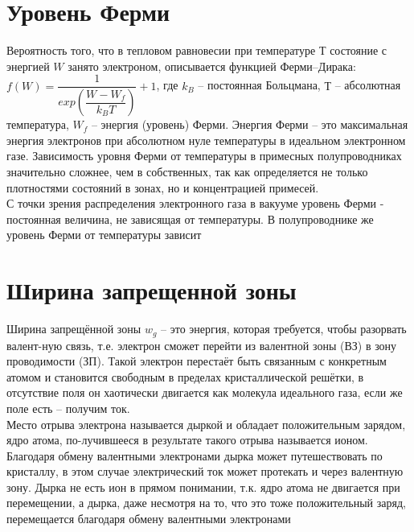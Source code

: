 \begin{multicols*}{2}
		\section{Уровень Ферми}
		Вероятность того, что в тепловом равновесии при температуре $Т$ состояние с энергией $W$ занято электроном, описывается функцией Ферми–Дирака: \\
		$f(W) = \dfrac{1}{exp(\dfrac{W-W_f}{k_BT})}+1$, где $k_B$ – постоянная Больцмана, $Т$ – абсолютная температура, $W_f$ – энергия (уровень) Ферми. Энергия Ферми – это максимальная энергия электронов при абсолютном нуле температуры в идеальном электронном газе. Зависимость уровня Ферми от температуры в примесных полупроводниках значительно сложнее, чем в собственных, так как определяется не только плотностями состояний в зонах, но и концентрацией примесей.\\
		С точки зрения распределения электронного газа в вакууме уровень Ферми - постоянная величина, не зависящая от температуры. В полупроводнике же уровень Ферми от температуры зависит

		\section{Ширина запрещенной зоны}
		Ширина запрещённой зоны $w_g$ – это энергия, которая требуется, чтобы разорвать валент-ную связь, т.е. электрон сможет перейти из валентной зоны (ВЗ) в зону проводимости (ЗП). Такой электрон перестаёт быть связанным с конкретным атомом и становится свободным в пределах кристаллической решётки, в отсутствие поля он хаотически двигается как молекула идеального газа, если же поле есть – получим ток.\\
		Место отрыва электрона называется дыркой и обладает положительным зарядом, ядро атома, по-лучившееся в результате такого отрыва называется ионом. Благодаря обмену валентными электронами дырка может путешествовать по кристаллу, в этом случае электрический ток может протекать и через валентную зону. Дырка не есть ион в прямом понимании, т.к. ядро атома не двигается при перемещении, а дырка, даже несмотря на то, что это тоже положительный заряд, перемещается благодаря обмену валентными электронами


\end{multicols*}
